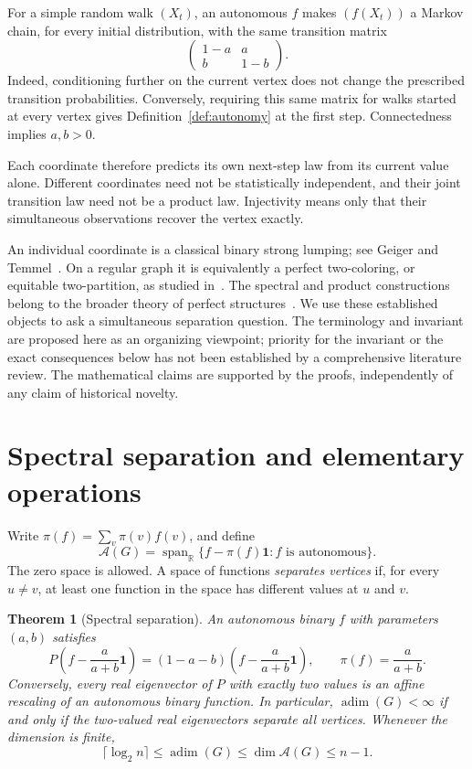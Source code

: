 \documentclass[11pt]{article}
\newtheorem{theorem}{Theorem}[section]
\theoremstyle{definition}
\newcommand{\adim}{\operatorname{adim}}
\newcommand{\R}{\mathbb R}
\newcommand{\one}{\mathbf 1}
\newcommand{\Aut}{\mathcal A}
\numberwithin{equation}{section}
\begin{document}
For a simple random walk $(X_t)$, an autonomous $f$ makes $(f(X_t))$ a
Markov chain, for every initial distribution, with the same transition
matrix
\[
 \begin{pmatrix}1-a&a\\b&1-b\end{pmatrix}.
\]
Indeed, conditioning further on the current vertex does not change the
prescribed transition probabilities. Conversely, requiring this same
matrix for walks started at every vertex gives Definition~\ref{def:autonomy}
at the first step. Connectedness implies $a,b>0$.

Each coordinate therefore predicts its own next-step law from its current
value alone. Different coordinates need not be statistically independent,
and their joint transition law need not be a product law. Injectivity means
only that their simultaneous observations recover the vertex exactly.

An individual coordinate is a classical binary strong lumping; see
Geiger and Temmel~\cite{GT}. On a regular graph it is equivalently a perfect
two-coloring, or equitable two-partition, as studied in~\cite{BKM}.
The spectral and product constructions belong to the broader theory of
perfect structures~\cite{Taranenko}. We use these established objects to
ask a simultaneous separation question. The terminology and invariant are
proposed here as an organizing viewpoint; priority for the invariant or
the exact consequences below has not been established by a comprehensive
literature review. The mathematical claims are supported by the proofs,
independently of any claim of historical novelty.

\section{Spectral separation and elementary operations}

Write $\pi(f)=\sum_v\pi(v)f(v)$, and define
\[
 \Aut(G)=\operatorname{span}_{\R}
 \{f-\pi(f)\one:f\text{ is autonomous}\}.
\]
The zero space is allowed. A space of functions \emph{separates vertices}
if, for every $u\ne v$, at least one function in the space has different
values at $u$ and $v$.

\begin{theorem}[Spectral separation]\label{thm:spectral}
An autonomous binary $f$ with parameters $(a,b)$ satisfies
\begin{equation}\label{eq:eigen}
 P\left(f-\frac{a}{a+b}\one\right)
 =(1-a-b)\left(f-\frac{a}{a+b}\one\right),
 \qquad \pi(f)=\frac{a}{a+b}.
\end{equation}
Conversely, every real eigenvector of $P$ with exactly two values is an
affine rescaling of an autonomous binary function. In particular,
$\adim(G)<\infty$ if and only if the two-valued real eigenvectors separate
all vertices. Whenever the dimension is finite,
\begin{equation}\label{eq:bounds}
 \lceil\log_2 n\rceil\leq\adim(G)
 \leq\dim\Aut(G)\leq n-1.
\end{equation}
\end{theorem}
\end{document}
